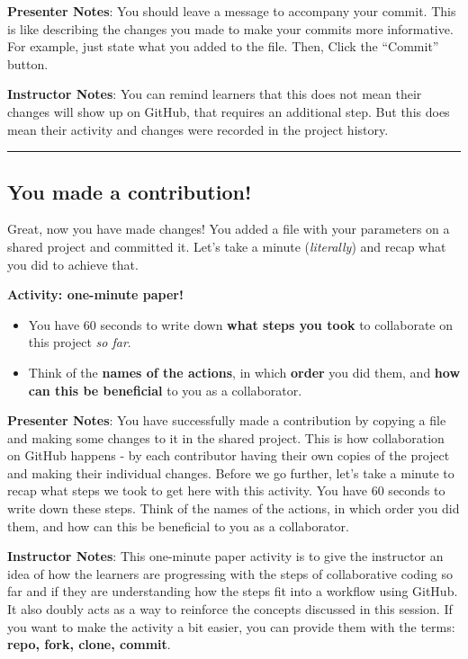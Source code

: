 \documentclass[
  letterpaper,
  DIV=11,
  numbers=noendperiod]{scrartcl}
\providecommand{\tightlist}{%
  \setlength{\itemsep}{0pt}\setlength{\parskip}{0pt}}
\begin{document}
\textbf{Presenter Notes}: You should leave a message to accompany your
commit. This is like describing the changes you made to make your
commits more informative. For example, just state what you added to the
file. Then, Click the ``Commit'' button.

\textbf{Instructor Notes}: You can remind learners that this does not
mean their changes will show up on GitHub, that requires an additional
step. But this does mean their activity and changes were recorded in the
project history.

\begin{center}\rule{0.5\linewidth}{0.5pt}\end{center}

\subsection{You made a contribution!}\label{you-made-a-contribution}

Great, now you have made changes! You added a file with your parameters
on a shared project and committed it. Let's take a minute
(\emph{literally}) and recap what you did to achieve that.

\textbf{Activity: one-minute paper!}

\begin{itemize}
\tightlist
\item
  You have 60 seconds to write down \textbf{what steps you took} to
  collaborate on this project \emph{so far}.
\item
  Think of the \textbf{names of the actions}, in which \textbf{order}
  you did them, and \textbf{how can this be beneficial} to you as a
  collaborator.
\end{itemize}

\textbf{Presenter Notes}: You have successfully made a contribution by
copying a file and making some changes to it in the shared project. This
is how collaboration on GitHub happens - by each contributor having
their own copies of the project and making their individual changes.
Before we go further, let's take a minute to recap what steps we took to
get here with this activity. You have 60 seconds to write down these
steps. Think of the names of the actions, in which order you did them,
and how can this be beneficial to you as a collaborator.

\textbf{Instructor Notes}: This one-minute paper activity is to give the
instructor an idea of how the learners are progressing with the steps of
collaborative coding so far and if they are understanding how the steps
fit into a workflow using GitHub. It also doubly acts as a way to
reinforce the concepts discussed in this session. If you want to make
the activity a bit easier, you can provide them with the terms:
\textbf{repo, fork, clone, commit}.
\end{document}
